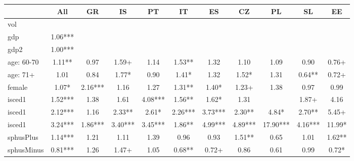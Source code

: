{
\def\sym#1{\ifmmode^{#1}\else\(^{#1}\)\fi}
\begin{tabular}{l*{10}{c}}
\hline\hline
            &\multicolumn{1}{c}{All}&\multicolumn{1}{c}{GR}&\multicolumn{1}{c}{IS}&\multicolumn{1}{c}{PT}&\multicolumn{1}{c}{IT}&\multicolumn{1}{c}{ES}&\multicolumn{1}{c}{CZ}&\multicolumn{1}{c}{PL}&\multicolumn{1}{c}{SL}&\multicolumn{1}{c}{EE}\\
\hline
vol         &               &               &               &               &               &               &               &               &               &               \\
gdp         &        1.06***&               &               &               &               &               &               &               &               &               \\
gdp2        &        1.00***&               &               &               &               &               &               &               &               &               \\
age: 60-70  &        1.11** &        0.97   &        1.59+  &        1.14   &        1.53** &        1.32   &        1.10   &        1.09   &        0.90   &        0.76+  \\
age: 71+    &        1.01   &        0.84   &        1.77*  &        0.90   &        1.41*  &        1.32   &        1.52*  &        1.31   &        0.64** &        0.72+  \\
female    &        1.07*  &        2.16***&        1.16   &        1.27   &        1.31** &        1.40*  &        1.23+  &        1.38   &        0.97   &        0.99   \\
isced1    &        1.52***&        1.38   &        1.61   &        4.08***&        1.56** &        1.62*  &        1.31   &               &        1.87+  &        4.16   \\
isced1    &        2.12***&        1.16   &        2.33** &        2.61*  &        2.26***&        3.73***&        2.30** &        4.84*  &        2.70** &        5.45+  \\
isced1    &        3.24***&        1.86***&        3.40***&        3.45***&        1.86** &        4.99***&        4.89***&       17.90***&        4.16***&       11.99*  \\
sphusPlus   &        1.14***&        1.21   &        1.11   &        1.39   &        0.96   &        0.93   &        1.51** &        0.65   &        1.01   &        1.62** \\
sphusMinus  &        0.81***&        1.26   &        1.47+  &        1.05   &        0.68** &        0.72+  &        0.86   &        0.61   &        0.99   &        0.72*  \\

\end{tabular}}
